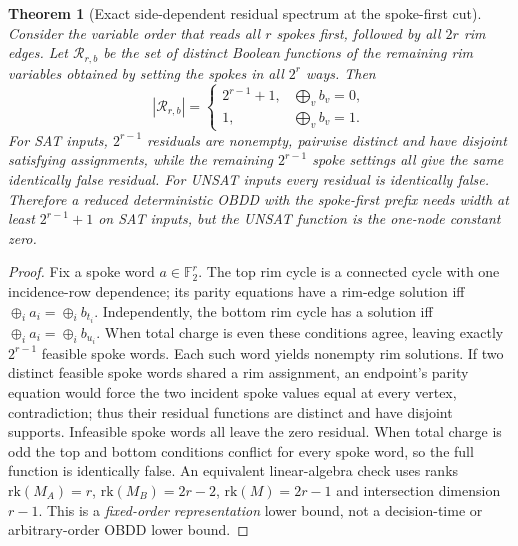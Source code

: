 \documentclass[11pt]{article}
\newtheorem{theorem}{Theorem}
\begin{document}
\begin{theorem}[Exact side-dependent residual spectrum at the spoke-first cut]
Consider the variable order that reads all $r$ spokes first, followed by all $2r$ rim edges. Let $\mathcal R_{r,b}$ be the set of distinct Boolean functions of the remaining rim variables obtained by setting the spokes in all $2^r$ ways. Then
\[
 |\mathcal R_{r,b}|=\begin{cases}
 2^{r-1}+1,&\bigoplus_v b_v=0,\\
 1,&\bigoplus_v b_v=1.
 \end{cases}
\]
For SAT inputs, $2^{r-1}$ residuals are nonempty, pairwise distinct and have disjoint satisfying assignments, while the remaining $2^{r-1}$ spoke settings all give the same identically false residual. For UNSAT inputs every residual is identically false. Therefore a reduced deterministic OBDD with the spoke-first prefix needs width at least $2^{r-1}+1$ on SAT inputs, but the UNSAT function is the one-node constant zero.
\end{theorem}
\begin{proof}
Fix a spoke word $a\in\mathbb F_2^r$. The top rim cycle is a connected cycle with one incidence-row dependence; its parity equations have a rim-edge solution iff $\oplus_i a_i=\oplus_i b_{t_i}$. Independently, the bottom rim cycle has a solution iff $\oplus_i a_i=\oplus_i b_{u_i}$. When total charge is even these conditions agree, leaving exactly $2^{r-1}$ feasible spoke words. Each such word yields nonempty rim solutions. If two distinct feasible spoke words shared a rim assignment, an endpoint's parity equation would force the two incident spoke values equal at every vertex, contradiction; thus their residual functions are distinct and have disjoint supports. Infeasible spoke words all leave the zero residual. When total charge is odd the top and bottom conditions conflict for every spoke word, so the full function is identically false. An equivalent linear-algebra check uses ranks $\mathrm{rk}(M_A)=r$, $\mathrm{rk}(M_B)=2r-2$, $\mathrm{rk}(M)=2r-1$ and intersection dimension $r-1$. This is a \emph{fixed-order representation} lower bound, not a decision-time or arbitrary-order OBDD lower bound.
\end{proof}
\end{document}
